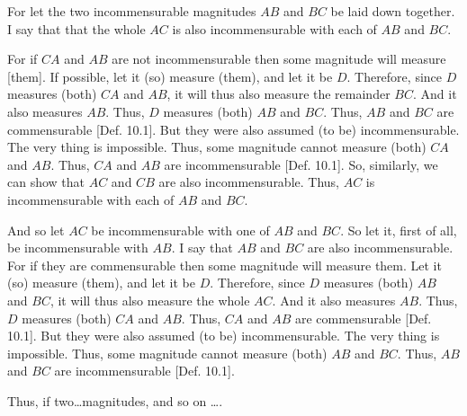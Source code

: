 \begin{Parallel}{}{}
{\epsfysize=0.6in
\centerline{}

For let the two incommensurable magnitudes $AB$ and $BC$ be
laid down together. I say that that the whole $AC$ is also
incommensurable with each of $AB$ and $BC$.

For if $CA$ and $AB$ are not incommensurable then some magnitude
will measure [them]. If possible, let it (so) measure (them), and let it
be $D$. Therefore, since $D$ measures (both) $CA$ and $AB$, it will
thus also measure the remainder $BC$. And it also measures $AB$.
Thus, $D$ measures (both) $AB$ and $BC$. Thus, $AB$ and $BC$ are
commensurable [Def. 10.1]. But they were also assumed (to be) incommensurable.
The very thing is impossible. Thus, some magnitude cannot
measure (both) $CA$ and $AB$. Thus, $CA$ and $AB$ are incommensurable [Def. 10.1]. So, similarly, we can show that $AC$ and
$CB$ are also incommensurable. Thus, $AC$ is incommensurable with each
of $AB$ and $BC$.

And so let $AC$ be incommensurable with one of $AB$ and $BC$. So
let it, first of all, be incommensurable with $AB$. I say that $AB$ and
$BC$ are also incommensurable. For if they are commensurable then
some magnitude will measure them. Let it (so) measure (them), and let it
be $D$. Therefore, since $D$ measures (both) $AB$ and $BC$, 
it will thus also measure the whole  $AC$. And it also measures $AB$. 
Thus, $D$ measures (both) $CA$ and $AB$. Thus, $CA$ and $AB$
are commensurable  [Def. 10.1]. But they
were also assumed (to be) incommensurable. The very thing is
impossible. Thus, some magnitude cannot measure (both) $AB$ and
$BC$. Thus, $AB$ and $BC$ are incommensurable  [Def. 10.1].

Thus, if two\ldots magnitudes, and so on \ldots.}
\end{Parallel}

